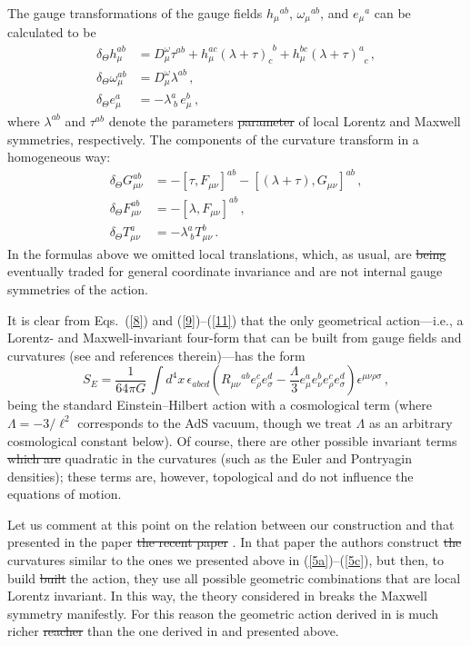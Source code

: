 \documentclass[11pt, a4paper]{article}
\newcommand{\lang}[1]{\textcolor{langfix}{#1}}
\newcommand{\subst}[1]{\textcolor{substantive}{#1}}
\newcommand{\rem}[1]{\textcolor{removeprop}{\sout{#1}}}
\begin{document}
The gauge transformations of the gauge fields $h_\mu{}^{ab}$, $\omega_\mu{}^{ab}$, and $e_\mu{}^{a}$ can be calculated to be
\begin{align}
\delta_\Theta h^{ab}_{\mu}&=D^\omega_\mu \tau^{ab}+
h^{ac}_\mu(\lambda+\tau)_{c}^{\;\,b}+h^{bc}_\mu(\lambda+\tau)^{a}_{\;\;c}\,,\label{6}\\
\delta_\Theta \omega^{ab}_{\mu}&= D^\omega_\mu \lambda^{ab}\,,\label{7}\\
\delta_\Theta e^{a}_{\mu}&=-\lambda^a_{\;b}\,e^b_\mu\,,\label{8}
\end{align}
where $\lambda^{ab}$ and $\tau^{ab}$ denote the \lang{parameters} \rem{parameter} of local Lorentz and Maxwell symmetries, respectively. The components of the curvature transform in a homogeneous way:
\begin{align}
\delta_\Theta G^{ab}_{\mu\nu}&=-[\tau,F_{\mu\nu}]^{ab}-[(\lambda+\tau),G_{\mu\nu}]^{ab}\,,\label{9}\\
\delta_\Theta F^{ab}_{\mu\nu}&=-[\lambda,F_{\mu\nu}]^{ab}\,,\label{10}\\
\delta_\Theta T^{a}_{\mu\nu}&=-\lambda^a_{\;b}T^b_{\mu\nu}\,.\label{11}
\end{align}
In the formulas above we omitted local translations, which, as usual, are \rem{being} eventually traded for general coordinate invariance and are not \lang{internal gauge} symmetries of the action.

It is clear from Eqs.\ (\ref{8}) and (\ref{9})--(\ref{11}) that the only geometrical action\lang{---}i.e., a Lorentz- and Maxwell-invariant four-form that can be built from gauge fields and curvatures (see \cite{Durka:2011nf} and references therein)\lang{---}has the form
\begin{equation}
S_{E} =\frac{1}{64\pi G}\,
\int d^4x\,\epsilon_{abcd}\left(R_{\mu\nu}{}^{ab}e_{\rho}^{c}e_{\sigma}^{d}
-\frac{\Lambda}{3}e_{\mu}^{a}e_{\nu}^{b}e_{\rho}^{ c}e_{\sigma}^{
d}\right)\epsilon^{\mu\nu\rho\sigma}\,,\label{12}
\end{equation}
being the standard Einstein\lang{--Hilbert} action with a cosmological term \subst{(where $\Lambda = -3/\ell^2$ corresponds to the AdS vacuum, though we treat $\Lambda$ as an arbitrary cosmological constant below)}. Of course, there are other possible invariant terms \rem{which are} quadratic in the curvatures \subst{(such as the Euler and Pontryagin densities)}; these terms are, however, topological and do not influence \lang{the} equations of motion.

Let us comment at this point \lang{on} the relation between our construction and that presented in \lang{the paper} \rem{the recent paper} \cite{deAzcarraga:2010sw}. In that paper the authors construct \rem{the} curvatures similar to the ones we presented above in (\ref{5a})--(\ref{5c}), but then, to \lang{build} \rem{built} the action, they use all possible geometric combinations that are local Lorentz invariant. In this way, the theory considered in \cite{deAzcarraga:2010sw} breaks the Maxwell symmetry manifestly. For this reason the geometric action derived in \cite{deAzcarraga:2010sw} is much \lang{richer} \rem{reacher} than the one derived in \cite{Durka:2011nf} and presented above.
\end{document}

